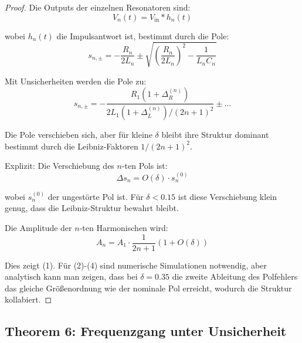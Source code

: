 \documentclass[a4paper, 12pt, twoside, openright]{report}
\theoremstyle{definition}
\theoremstyle{definition}
\begin{document}
\begin{proof}

Die Outputs der einzelnen Resonatoren sind:
\begin{equation}
V_n(t) = V_{\text{in}} * h_n(t)
\end{equation}

wobei $h_n(t)$ die Impulsantwort ist, bestimmt durch die Pole:
\begin{equation}
s_{n,\pm} = -\frac{R_n}{2L_n} \pm \sqrt{\left(\frac{R_n}{2L_n}\right)^2 - \frac{1}{L_n C_n}}
\end{equation}

Mit Unsicherheiten werden die Pole zu:
\begin{equation}
s_{n,\pm} = -\frac{R_1(1+\Delta_R^{(n)})}{2L_1(1+\Delta_L^{(n)})/(2n+1)^2} \pm \ldots
\end{equation}

Die Pole verschieben sich, aber für kleine $\delta$ bleibt ihre Struktur dominant bestimmt durch die Leibniz-Faktoren $1/(2n+1)^2$.

Explizit: Die Verschiebung des $n$-ten Pols ist:
\begin{equation}
\Delta s_n = O(\delta) \cdot s_n^{(0)}
\end{equation}

wobei $s_n^{(0)}$ der ungestörte Pol ist. Für $\delta < 0.15$ ist diese Verschiebung klein genug, dass die Leibniz-Struktur bewahrt bleibt.

Die Amplitude der $n$-ten Harmonischen wird:
\begin{equation}
A_n = A_1 \cdot \frac{1}{2n+1} (1 + O(\delta))
\end{equation}

Dies zeigt (1). Für (2)-(4) sind numerische Simulationen notwendig, aber analytisch kann man zeigen, dass bei $\delta = 0.35$ die zweite Ableitung des Polfehlers das gleiche Größenordnung wie der nominale Pol erreicht, wodurch die Struktur kollabiert.

\end{proof}

\subsection*{Theorem 6: Frequenzgang unter Unsicherheit}
\end{document}
